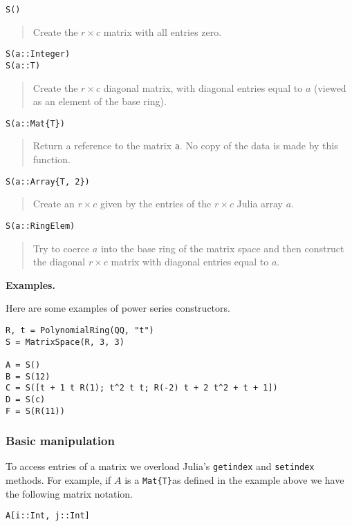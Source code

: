 \documentclass[a4paper,10pt]{article}
\newcommand{\code}{\lstinline}
\newcommand{\desc}[1]{\vspace{-3mm}\begin{quote}#1\end{quote}}
\begin{document}
\begin{lstlisting}
S()
\end{lstlisting}

\desc{Create the $r\times c$ matrix with all entries zero.}

\begin{lstlisting}
S(a::Integer)
S(a::T)
\end{lstlisting}

\desc{Create the $r\times c$ diagonal matrix, with diagonal entries equal to
$a$ (viewed as an element of the base ring).}

\begin{lstlisting}
S(a::Mat{T})
\end{lstlisting}

\desc{Return a reference to the matrix \code{a}. No copy of the data is
made by this function.}

\begin{lstlisting}
S(a::Array{T, 2})
\end{lstlisting}

\desc{Create an $r\times c$ given by the entries of the $r\times c$ Julia array
$a$.}

\begin{lstlisting}
S(a::RingElem)
\end{lstlisting}

\desc{Try to coerce $a$ into the base ring of the matrix space and then construct
the diagonal $r\times c$ matrix with diagonal entries equal to $a$.}

\textbf{Examples.}

Here are some examples of power series constructors.

\begin{lstlisting}
R, t = PolynomialRing(QQ, "t")
S = MatrixSpace(R, 3, 3)

A = S()
B = S(12)
C = S([t + 1 t R(1); t^2 t t; R(-2) t + 2 t^2 + t + 1])
D = S(c)
F = S(R(11))
\end{lstlisting}

\subsubsection{Basic manipulation}

To access entries of a matrix we overload Julia's \code{getindex} and \code{setindex}
methods. For example, if $A$ is a \code|Mat{T}|as defined in the example above
we have the following matrix notation.

\begin{lstlisting}
A[i::Int, j::Int]
\end{lstlisting}
\end{document}
